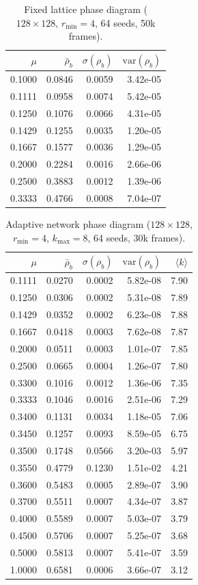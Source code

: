 \begin{table}[t]
\centering
\caption{Fixed lattice phase diagram ($128{\times}128$, $r_{\min}=4$, 64 seeds, 50k frames).}
\label{tab:fixed}
\begin{tabular}{rrrr}
\toprule
$\mu$ & $\bar{\rho}_b$ & $\sigma(\rho_b)$ & $\mathrm{var}(\rho_b)$ \\
\midrule
0.1000 & 0.0846 & 0.0059 & 3.42e-05 \\
0.1111 & 0.0958 & 0.0074 & 5.42e-05 \\
0.1250 & 0.1076 & 0.0066 & 4.31e-05 \\
0.1429 & 0.1255 & 0.0035 & 1.20e-05 \\
0.1667 & 0.1577 & 0.0036 & 1.29e-05 \\
0.2000 & 0.2284 & 0.0016 & 2.66e-06 \\
0.2500 & 0.3883 & 0.0012 & 1.39e-06 \\
0.3333 & 0.4766 & 0.0008 & 7.04e-07 \\
\bottomrule
\end{tabular}
\end{table}

\begin{table}[t]
\centering
\caption{Adaptive network phase diagram ($128{\times}128$, $r_{\min}=4$, $k_{\max}=8$, 64 seeds, 30k frames).}
\label{tab:adaptive}
\begin{tabular}{rrrrr}
\toprule
$\mu$ & $\bar{\rho}_b$ & $\sigma(\rho_b)$ & $\mathrm{var}(\rho_b)$ & $\langle k \rangle$ \\
\midrule
0.1111 & 0.0270 & 0.0002 & 5.82e-08 & 7.90 \\
0.1250 & 0.0306 & 0.0002 & 5.31e-08 & 7.89 \\
0.1429 & 0.0352 & 0.0002 & 6.23e-08 & 7.88 \\
0.1667 & 0.0418 & 0.0003 & 7.62e-08 & 7.87 \\
0.2000 & 0.0511 & 0.0003 & 1.01e-07 & 7.85 \\
0.2500 & 0.0665 & 0.0004 & 1.26e-07 & 7.80 \\
0.3300 & 0.1016 & 0.0012 & 1.36e-06 & 7.35 \\
0.3333 & 0.1046 & 0.0016 & 2.51e-06 & 7.29 \\
0.3400 & 0.1131 & 0.0034 & 1.18e-05 & 7.06 \\
0.3450 & 0.1257 & 0.0093 & 8.59e-05 & 6.75 \\
0.3500 & 0.1748 & 0.0566 & 3.20e-03 & 5.97 \\
0.3550 & 0.4779 & 0.1230 & 1.51e-02 & 4.21 \\
0.3600 & 0.5483 & 0.0005 & 2.89e-07 & 3.90 \\
0.3700 & 0.5511 & 0.0007 & 4.34e-07 & 3.87 \\
0.4000 & 0.5589 & 0.0007 & 5.03e-07 & 3.79 \\
0.4500 & 0.5706 & 0.0007 & 5.25e-07 & 3.68 \\
0.5000 & 0.5813 & 0.0007 & 5.41e-07 & 3.59 \\
1.0000 & 0.6581 & 0.0006 & 3.66e-07 & 3.12 \\
\bottomrule
\end{tabular}
\end{table}

